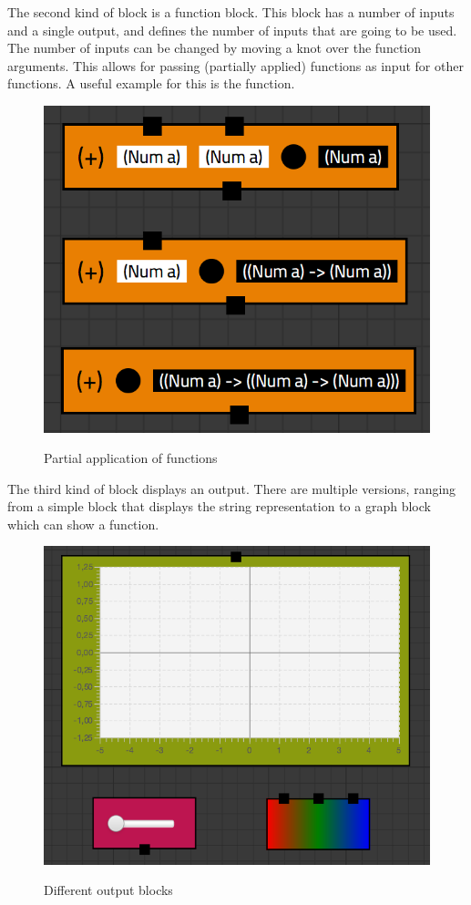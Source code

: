 The second kind of block is a function block. This block has a number of inputs and a single output, and defines the number of inputs that are going to be used.
The number of inputs can be changed by moving a knot over the function arguments.
This allows for passing (partially applied) functions as input for other functions.
A useful example for this is the  function.

\begin{figure}[p]
	\centering
	\includegraphics[scale=0.5]{Images/blocks-bowties}
	\label{fig:blocks-bowties}
	\caption{Partial application of functions}
\end{figure}

The third kind of block displays an output.
There are multiple versions, ranging from a simple block that displays the string representation to a graph block which can show a function.

\begin{figure}[p]
	\centering
	\includegraphics[scale=0.5]{Images/blocks-outputs}
	\label{fig:blocks-outputs}
	\caption{Different output blocks}
\end{figure}

